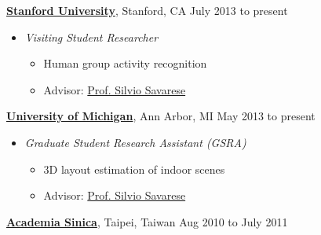 \documentclass[10pt]{article}
\newenvironment{innerlist}[1][\enskip\textbullet]%
        {\begin{itemize}[#1,leftmargin=*,parsep=0pt,itemsep=0pt,topsep=0pt,partopsep=0pt]}
        {\end{itemize}}
\begin{document}
\href{http://www.stanford.edu}{\textbf{Stanford University}}, Stanford, CA \hfill {July 2013 to present} \\
\vspace{-.15in}
\begin{innerlist}
\item[] \emph{Visiting Student Researcher} \\
    \vspace{-.15in}
    \begin{innerlist}
    \item Human group activity recognition
    \item Advisor: \href{http://cvgl.stanford.edu/silvio/}{Prof. Silvio Savarese}
    \end{innerlist}
\end{innerlist}
\vspace{.1in}
\href{http://www.umich.edu}{\textbf{University of Michigan}}, Ann Arbor, MI \hfill {May 2013 to present} \\
\vspace{-.15in}
\begin{innerlist}
\item[] \emph{Graduate Student Research Assistant (GSRA)} \\
    \vspace{-.15in}
    \begin{innerlist}
    \item 3D layout estimation of indoor scenes
    \item Advisor: \href{http://cvgl.stanford.edu/silvio/}{Prof. Silvio Savarese}
    \end{innerlist}
\end{innerlist}
\vspace{.1in}
\href{http://www.sinica.edu.tw}{\textbf{Academia Sinica}}, Taipei, Taiwan \hfill {Aug 2010 to July 2011} \\
\vspace{-.15in}
\end{document}
